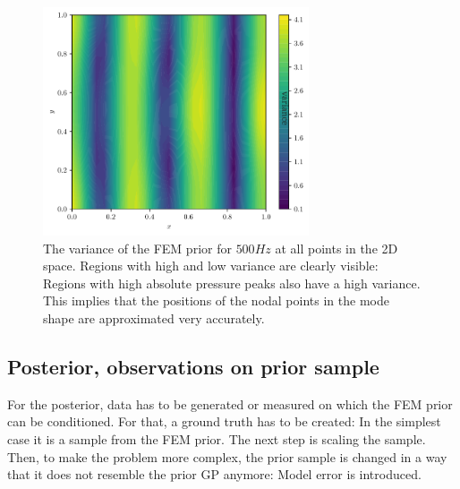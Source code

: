 \documentclass[%
  a4paper,oneside,%
  11pt,%
  smallchapters,
  style=printdev,
  extramargin,
  green,%
  rgb, <cmyk>
  ]{tubsbook}
\begin{document}
\begin{figure}[!ht]
\includegraphics[width=0.7\textwidth]{pics/VarField.pdf}
\centering
\caption[Variance of the FEM prior at 500Hz]{The variance of the FEM prior for $500Hz$ at all points in the 2D space. Regions with high and low variance are clearly visible: Regions with high absolute pressure peaks also have a high variance. This implies that the positions of the nodal points in the mode shape are approximated very accurately.}
\label{fig:varFieldPrior}
\end{figure}
%
%
%
%


\subsection{Posterior, observations on prior sample}
For the posterior, data has to be generated or measured on which the FEM prior can be conditioned. For that, a ground truth has to be created: In the simplest case it is a sample from the FEM prior. The next step is scaling the sample. Then, to make the problem more complex, the prior sample is changed in a way that it does not resemble the prior GP anymore: Model error is introduced.
\end{document}
